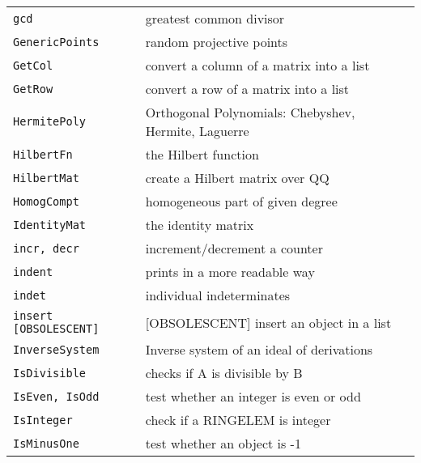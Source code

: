 \documentclass[a4paper]{mybook}
\begin{document}
\begin{center}
\begin{longtable}{ll}
{\verb~gcd~} &
      greatest common divisor\\
   
{\verb~GenericPoints~} &
      random projective points\\
   
{\verb~GetCol~} &
      convert a column of a matrix into a list\\
   
{\verb~GetRow~} &
      convert a row of a matrix into a list\\
   
{\verb~HermitePoly~} &
      Orthogonal Polynomials: Chebyshev, Hermite, Laguerre\\
   
{\verb~HilbertFn~} &
      the Hilbert function\\
   
{\verb~HilbertMat~} &
      create a Hilbert matrix over QQ\\
   
{\verb~HomogCompt~} &
      homogeneous part of given degree\\
   
{\verb~IdentityMat~} &
      the identity matrix\\
   
{\verb~incr, decr~} &
      increment/decrement a counter\\
   
{\verb~indent~} &
      prints in a more readable way\\
   
{\verb~indet~} &
      individual indeterminates\\
   
{\verb~insert [OBSOLESCENT]~} &
      [OBSOLESCENT] insert an object in a list\\
   
{\verb~InverseSystem~} &
      Inverse system of an ideal of derivations\\
   
{\verb~IsDivisible~} &
      checks if A is divisible by B\\
   
{\verb~IsEven, IsOdd~} &
      test whether an integer is even or odd\\
   
{\verb~IsInteger~} &
      check if a RINGELEM is integer\\
   
{\verb~IsMinusOne~} &
      test whether an object is -1\\
   

\end{longtable}
\end{center}
\end{document}
